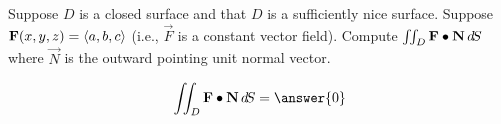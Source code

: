 \documentclass{ximera}
\author{David Guichard \and Neal Koblitz \and H. Jerome Keisler \and Albert Scheller \and Barry Balof \and Mike Wills \and Matthew Carr}
\begin{document}
\begin{exercise}




Suppose $D$ is a closed surface and that $D$ is a sufficiently nice surface. Suppose $\mathbf{F}(x,y,z)=\left\langle a,b,c\right\rangle$ (i.e., $\vec{F}$ is a constant vector field). Compute $\iint_{D}\mathbf{F}\bullet\mathbf{N}\mathop{}\!d\! S$ where $\vec{N}$ is the outward pointing unit normal vector.

\begin{prompt}
\[
\iint_{D}\vec{F}\dotp\vec{N}\d S=\answer{0}
\]
\end{prompt}


\end{exercise}
\end{document}
